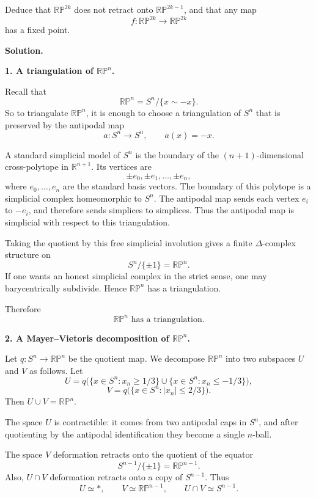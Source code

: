 \documentclass[12pt,a4paper]{article}
\theoremstyle{notespace}
\begin{document}
Deduce that \(\mathbb{RP}^{2k}\) does not retract onto \(\mathbb{RP}^{2k-1}\), and that any map
\[
f:\mathbb{RP}^{2k}\to \mathbb{RP}^{2k}
\]
has a fixed point.

\textbf{Solution.}

\medskip

\textbf{1. A triangulation of \(\mathbb{RP}^n\).}

Recall that
\[
\mathbb{RP}^n=S^n/\{x\sim -x\}.
\]
So to triangulate \(\mathbb{RP}^n\), it is enough to choose a triangulation of \(S^n\) that is preserved by the antipodal map
\[
a:S^n\to S^n,\qquad a(x)=-x.
\]

A standard simplicial model of \(S^n\) is the boundary of the \((n+1)\)-dimensional cross-polytope in \(\mathbb R^{n+1}\). Its vertices are
\[
\pm e_0,\pm e_1,\dots,\pm e_n,
\]
where \(e_0,\dots,e_n\) are the standard basis vectors. The boundary of this polytope is a simplicial complex homeomorphic to \(S^n\). The antipodal map sends each vertex \(e_i\) to \(-e_i\), and therefore sends simplices to simplices. Thus the antipodal map is simplicial with respect to this triangulation.

Taking the quotient by this free simplicial involution gives a finite \(\Delta\)-complex structure on
\[
S^n/\{\pm 1\}=\mathbb{RP}^n.
\]
If one wants an honest simplicial complex in the strict sense, one may barycentrically subdivide. Hence \(\mathbb{RP}^n\) has a triangulation.

Therefore
\[
\boxed{\mathbb{RP}^n \text{ has a triangulation.}}
\]

\medskip

\textbf{2. A Mayer--Vietoris decomposition of \(\mathbb{RP}^n\).}

Let \(q:S^n\to \mathbb{RP}^n\) be the quotient map. We decompose \(\mathbb{RP}^n\) into two subspaces \(U\) and \(V\) as follows. Let
\[
U=q\bigl(\{x\in S^n:x_n\ge 1/3\}\cup \{x\in S^n:x_n\le -1/3\}\bigr),
\]
\[
V=q\bigl(\{x\in S^n:|x_n|\le 2/3\}\bigr).
\]
Then \(U\cup V=\mathbb{RP}^n\).

The space \(U\) is contractible: it comes from two antipodal caps in \(S^n\), and after quotienting by the antipodal identification they become a single \(n\)-ball.

The space \(V\) deformation retracts onto the quotient of the equator
\[
S^{n-1}/\{\pm 1\}=\mathbb{RP}^{n-1}.
\]
Also, \(U\cap V\) deformation retracts onto a copy of \(S^{n-1}\). Thus
\[
U\simeq *,
\qquad
V\simeq \mathbb{RP}^{n-1},
\qquad
U\cap V\simeq S^{n-1}.
\]
\end{document}
